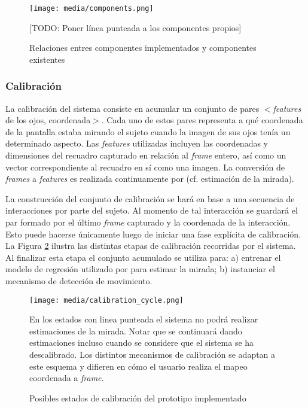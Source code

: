 \begin{figure}
    \centering
    \texttt{[image: media/components.png]}
    \caption{Relaciones entres componentes implementados y componentes
    existentes}
    [TODO: Poner línea punteada a los componentes propios]
    \label{fig:components}
\end{figure}

\subsubsection{Calibración}

La calibración del sistema consiste en acumular un conjunto de pares
$<$\textit{features} de los ojos, coordenada$>$.
Cada uno de estos pares representa a qué coordenada de la pantalla estaba
mirando el sujeto cuando la imagen de sus ojos tenía un determinado aspecto.
Las \textit{features} utilizadas incluyen las coordenadas y dimensiones del
recuadro capturado en relación al \textit{frame} entero, así como un vector
correspondiente al recuadro en sí como una imagen.
La conversión de \textit{frames} a \textit{features} es realizada continuamente
por \webgazer (cf. estimación de la mirada).

La construcción del conjunto de calibración se hará en base a una secuencia de
interacciones por parte del sujeto.
Al momento de tal interacción se guardará el par formado por el último
\textit{frame} capturado y la coordenada de la interacción.
Esto puede hacerse únicamente luego de iniciar una fase explícita de
calibración.
La Figura \ref{fig:calibration_cycle} ilustra las distintas etapas de
calibración recorridas por el sistema.
Al finalizar esta etapa el conjunto acumulado se utiliza para: a) entrenar el
modelo de regresión utilizado por \webgazer para estimar la mirada; b)
instanciar el mecanismo de detección de movimiento.

\begin{figure}
    \centering
    \texttt{[image: media/calibration\_cycle.png]}
    \caption{Posibles estados de calibración del prototipo implementado}
    En los estados con linea punteada el sistema no podrá realizar estimaciones
    de la mirada.
    Notar que se continuará dando estimaciones incluso cuando se considere que
    el sistema se ha descalibrado.
    Los distintos mecanismos de calibración se adaptan a este esquema y
    difieren en cómo el usuario realiza el mapeo coordenada a \textit{frame}.
    \label{fig:calibration_cycle}
\end{figure}


